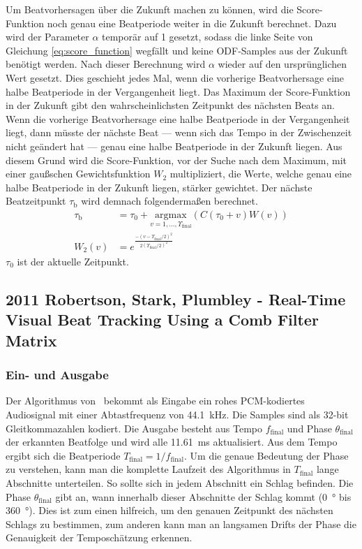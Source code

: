 {{{			%
			Um Beatvorhersagen über die Zukunft machen zu können,
				wird die Score-Funktion noch genau eine Beatperiode weiter in die Zukunft berechnet.
			Dazu wird der Parameter $\alpha$ temporär auf \num{1} gesetzt,
				sodass die linke Seite von Gleichung \eqref{eq:score_function} wegfällt
				und keine \ac{ODF}-Samples aus der Zukunft benötigt werden.
			Nach dieser Berechnung wird $\alpha$ wieder auf den ursprünglichen Wert gesetzt.
			Dies geschieht jedes Mal,
				wenn die vorherige Beatvorhersage eine halbe Beatperiode in der Vergangenheit liegt.
			Das Maximum der Score-Funktion in der Zukunft gibt den wahrscheinlichsten Zeitpunkt des nächsten Beats an.
			Wenn die vorherige Beatvorhersage eine halbe Beatperiode in der Vergangenheit liegt,
				dann müsste der nächste Beat
				--- wenn sich das Tempo in der Zwischenzeit nicht geändert hat ---
				genau eine halbe Beatperiode in der Zukunft liegen.
			Aus diesem Grund wird die Score-Funktion,
				vor der Suche nach dem Maximum,
				mit einer gau{\ss}schen Gewichtsfunktion $W_2$ multipliziert,
				die Werte, welche genau eine halbe Beatperiode in der Zukunft liegen,
				stärker gewichtet.
			Der nächste Beatzeitpunkt $\tau_\text{b}$ wird demnach folgenderma{\ss}en berechnet.
			\begin{align}
				\tau_\text{b} &= \tau_0 + \underset{v = 1, ..., \Upsilon_\text{final}}{\text{argmax}}(C(\tau_0 + v)W(v)) \\
				W_2(v) &= e^{\frac{-(v - \Upsilon_\text{final} / 2)^2}{2(\Upsilon_\text{final} / 2)^2}}
			\end{align}
			$\tau_0$ ist der aktuelle Zeitpunkt.
		}
	}

	\subsection{2011 Robertson, Stark, Plumbley - Real-Time Visual Beat Tracking Using a Comb Filter Matrix}
	{
		\subsubsection*{Ein- und Ausgabe}
		{
			Der Algorithmus von~\cite{2011_PlRoSt} bekommt als Eingabe ein rohes \acs{PCM}-kodiertes Audiosignal mit einer Abtastfrequenz von \SI{44.1}{\kilo\hertz}.
			Die Samples sind als 32-bit Gleitkommazahlen kodiert.
			Die Ausgabe besteht aus Tempo $f_\text{final}$ und Phase $\theta_\text{final}$ der erkannten Beatfolge
				und wird alle \SI{11.61}{\milli\second} aktualisiert.
			Aus dem Tempo ergibt sich die Beatperiode $T_\text{final} = 1 / f_\text{final}$.
			Um die genaue Bedeutung der Phase zu verstehen,
				kann man die komplette Laufzeit des Algorithmus in $T_\text{final}$ lange Abschnitte unterteilen.
			So sollte sich in jedem Abschnitt ein Schlag befinden.
			Die Phase $\theta_\text{final}$ gibt an,
				wann innerhalb dieser Abschnitte der Schlag kommt (\SI{0}{\degree} bis \SI{360}{\degree}).
			Dies ist zum einen hilfreich,
				um den genauen Zeitpunkt des nächsten Schlags zu bestimmen,
				zum anderen kann man an langsamen Drifts der Phase die Genauigkeit der Temposchätzung erkennen.
		}

}}
